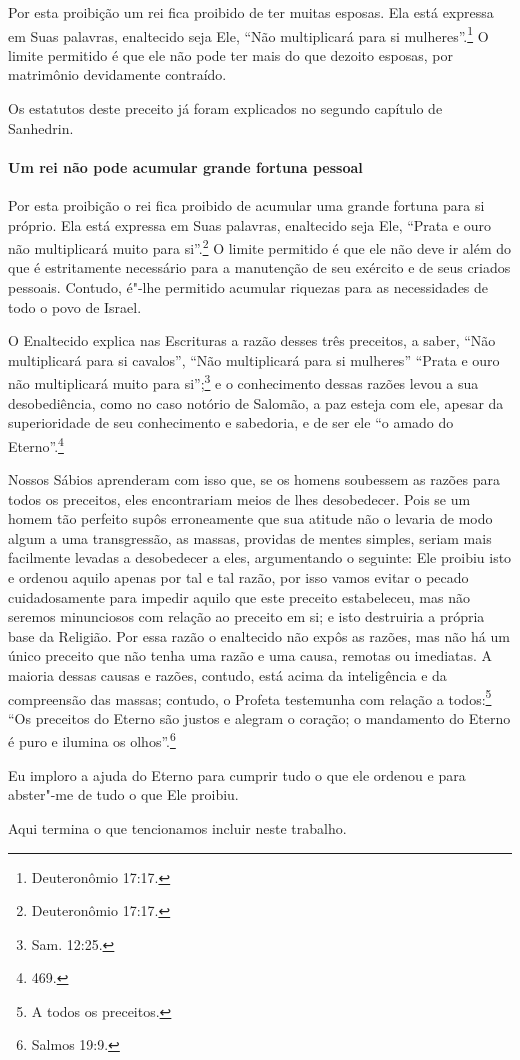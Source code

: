 \begin{multicols}{2}
Por esta proibição um rei fica proibido de ter muitas esposas. Ela está
expressa em Suas palavras, enaltecido seja Ele, ``Não multiplicará para
si mulheres''.\footnote{Deuteronômio 17:17.} O limite permitido é que ele não
pode ter mais do que dezoito esposas, por matrimônio devidamente
contraído.

Os estatutos deste preceito já foram explicados no segundo capítulo de
Sanhedrin\starr.

\paragraph{Um rei não pode acumular grande fortuna pessoal}

Por esta proibição o rei fica proibido de acumular uma grande fortuna
para si próprio. Ela está expressa em Suas palavras, enaltecido seja
Ele, ``Prata e ouro não multiplicará muito para si''.\footnote{Deuteronômio
17:17.} O limite permitido é que ele não deve ir além do que é
estritamente necessário para a manutenção de seu exército e de seus
criados pessoais. Contudo, é"-lhe permitido acumular riquezas para as
necessidades de todo o povo de Israel.

O Enaltecido explica nas Escrituras a razão desses três preceitos, a
saber, ``Não multiplicará para si cavalos'', ``Não multiplicará para si
mulheres'' ``Prata e ouro não multiplicará muito para
si'';\footnote{Sam. 12:25.} e o conhecimento dessas razões levou a sua
desobediência, como no caso notório de Salomão, a paz esteja com ele,
apesar da superioridade de seu conhecimento e sabedoria, e de ser ele
``o amado do Eterno''.\footnote{469.}

Nossos Sábios aprenderam com isso que, se os homens soubessem as razões
para todos os preceitos, eles encontrariam meios de lhes desobedecer.
Pois se um homem tão perfeito supôs erroneamente que sua atitude não o
levaria de modo algum a uma transgressão, as massas, providas de mentes
simples, seriam mais facilmente levadas a desobedecer a eles,
argumentando o seguinte: Ele proibiu isto e ordenou aquilo apenas por
tal e tal razão, por isso vamos evitar o pecado cuidadosamente para
impedir aquilo que este preceito estabeleceu, mas não seremos
minunciosos com relação ao preceito em si; e isto destruiria a própria
base da Religião. Por essa razão o enaltecido não expôs as razões, mas
não há um único preceito que não tenha uma razão e uma causa, remotas ou
imediatas. A maioria dessas causas e razões, contudo, está acima da
inteligência e da compreensão das massas; contudo, o Profeta testemunha com relação a
todos:\footnote{A todos os preceitos.} ``Os preceitos do Eterno são justos e
alegram o coração; o mandamento do Eterno é puro e ilumina os
olhos''.\footnote{Salmos 19:9.}

Eu imploro a ajuda do Eterno para cumprir tudo o que ele ordenou
e para abster"-me de tudo o que Ele proibiu.

Aqui termina o que tencionamos incluir neste trabalho.
\end{multicols}

